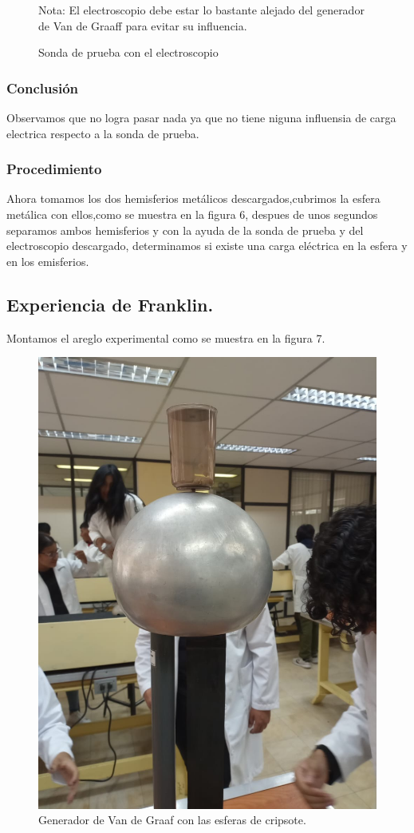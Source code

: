 \documentclass[10pt]{article}
\begin{document}
\begin{multicols}{2}
\begin{figure}[h]
\caption{Sonda de prueba con el electroscopio}
Nota: El electroscopio debe estar lo bastante alejado del generador de Van de Graaff para evitar su influencia.
\end{figure}

\subsubsection*{Conclusión}
Observamos que no logra pasar nada ya que no tiene niguna influensia de carga electrica respecto a la sonda de prueba.

\subsubsection*{Procedimiento}

Ahora tomamos los dos hemisferios metálicos descargados,cubrimos la esfera metálica con ellos,como se muestra en la figura 6, despues de unos segundos separamos ambos hemisferios y con la ayuda de la sonda de prueba y del electroscopio descargado, determinamos si existe una carga eléctrica en la esfera y en los emisferios.
\subsection{Experiencia de Franklin.}
Montamos el areglo experimental como se muestra en la figura 7.

\begin{figure}[h]
\centering
\includegraphics[scale=0.07]{p9}
\caption{Generador de Van de Graaf con las esferas de cripsote.}
\end{figure}


\end{multicols}
\end{document}
